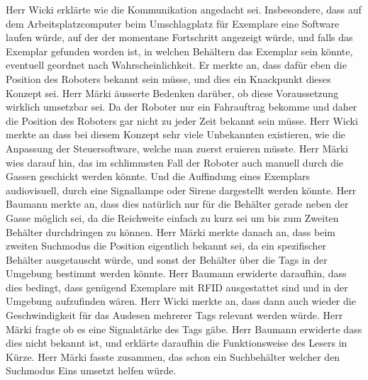 \documentclass[parskip=full, a4paper]{scrreprt}
\begin{document}
Herr Wicki erklärte wie die Kommunikation angedacht sei. Insbesondere, dass auf dem Arbeitsplatzcomputer beim Umschlagplatz für Exemplare eine Software laufen würde, auf der der momentane Fortschritt angezeigt würde, und falls das Exemplar gefunden worden ist, in welchen Behältern das Exemplar sein könnte, eventuell geordnet nach Wahrscheinlichkeit. Er merkte an, dass dafür eben die Position des Roboters bekannt sein müsse, und dies ein Knackpunkt dieses Konzept sei. Herr Märki äusserte Bedenken darüber, ob diese Voraussetzung wirklich umsetzbar sei. Da der Roboter nur ein Fahrauftrag bekomme und daher die Position des Roboters gar nicht zu jeder Zeit bekannt sein müsse.
Herr Wicki merkte an dass bei diesem Konzept sehr viele Unbekannten existieren, wie die Anpassung der Steuersoftware, welche man zuerst eruieren müsste. Herr Märki wies darauf hin, das im schlimmsten Fall der Roboter auch manuell durch die Gassen geschickt werden könnte. Und die Auffindung eines Exemplars audiovisuell, durch eine Signallampe oder Sirene dargestellt werden könnte. Herr Baumann merkte an, dass dies natürlich nur für die Behälter gerade neben der Gasse möglich sei, da die Reichweite einfach zu kurz sei um bis zum Zweiten Behälter durchdringen zu können.
Herr Märki merkte danach an, dass beim zweiten Suchmodus die Position eigentlich bekannt sei, da ein spezifischer Behälter ausgetauscht würde, und sonst der Behälter über die Tags in der Umgebung bestimmt werden könnte. Herr Baumann erwiderte daraufhin, dass dies bedingt, dass genügend Exemplare mit RFID ausgestattet sind und in der Umgebung aufzufinden wären. Herr Wicki merkte an, dass dann auch wieder die Geschwindigkeit für das Auslesen mehrerer Tags relevant werden würde.
Herr Märki fragte ob es eine Signalstärke des Tags gäbe. Herr Baumann erwiderte dass dies nicht bekannt ist, und erklärte daraufhin die Funktionsweise des Lesers in Kürze.
Herr Märki fasste zusammen, das schon ein Suchbehälter welcher den Suchmodus Eins umsetzt helfen würde.
\end{document}
